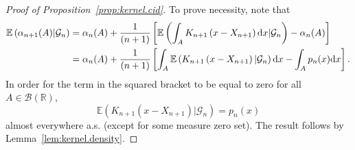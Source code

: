 \documentclass{article}
\theoremstyle{definition}
\newcommand{\di}{{\rm d}}
\renewcommand{\&}{and}
\begin{document}
\begin{proof}[Proof of Proposition~\ref{prop:kernel.cid}]
\noindent To prove necessity, note that 
\begin{align*}
 \mathbb{E}\left( \alpha_{n+1}(A) |\mathcal{G}_{n}\right) 
		&= \alpha_{n}(A)+\frac{1}{(n+1)}  \left[ \mathbb{E}\left(\int_A K_{n+1}\left(x-X_{n+1}\right)  \di x |\mathcal{G}_{n}\right) -
        \alpha_{n}(A)\right]\\ 
        &=\alpha_{n}(A)+\frac{1}{(n+1)}  \left[ \int_A \mathbb{E}\left( K_{n+1}\left(x-X_{n+1}\right) |\mathcal{G}_{n}\right)\di x -
       \int_A p_{n}(x) \di x \right].
	\end{align*} 
    In order for the term in the squared bracket to be equal to zero for all $A \in \mathcal{B}(\mathbb{R})$, $$\mathbb{E}\left( K_{n+1}\left(x-X_{n+1}\right) |\mathcal{G}_{n}\right)=p_{n}(x)$$ almost everywhere a.s. (except for some measure zero set). The result follows by Lemma~\ref{lem:kernel.density}.
\end{proof}
\end{document}
